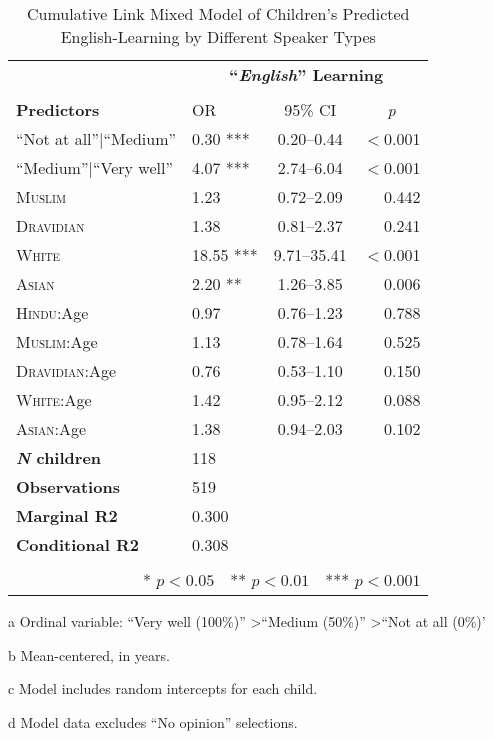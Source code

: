 \begin{table*}[t]
\small
\caption{Cumulative Link Mixed Model of Children's Predicted English-Learning by Different Speaker Types}\label{tab:english-ord}
    \centering
    \vspace{5pt}
\begin{threeparttable}
\begin{tabular}{llcr}
 \toprule
& \multicolumn{3}{c}{\textbf{``\textit{English}'' Learning}\tnote{a}} \\
\cline{2-4} \\[-.75em]
\textbf{Predictors} & {OR} & {95\% CI} & \multicolumn{1}{c}{\textit{p}} \\ 
\midrule
``Not at all''$|$``Medium'' & 0.30 *** & 0.20--0.44 & $<$0.001 \\ 
``Medium''$|$``Very well'' & 4.07 *** & 2.74--6.04 & $<$0.001 \\ 
  \textsc{Muslim} & 1.23 & 0.72--2.09 & 0.442 \\ 
  \textsc{Dravidian} & 1.38 & 0.81--2.37 & 0.241 \\ 
  \textsc{White} & 18.55 *** & 9.71--35.41 & $<$0.001 \\ 
  \textsc{Asian} & 2.20 ** & 1.26--3.85 & 0.006 \\ 
\textsc{Hindu}:Age\tnote{b} & 0.97 & 0.76--1.23 & 0.788 \\ 
  \textsc{Muslim}:Age & 1.13 & 0.78--1.64 & 0.525 \\ 
  \textsc{Dravidian}:Age & 0.76 & 0.53--1.10 & 0.150 \\ 
  \textsc{White}:Age & 1.42 & 0.95--2.12 & 0.088 \\ 
  \textsc{Asian}:Age & 1.38 & 0.94--2.03 & 0.102 \\ 
\midrule
\bfseries{\textit{N} children}\tnote{c} & 118 &  &  \\ 
\textbf{Observations}\tnote{d} & 519 &  &  \\ 
 \textbf{Marginal R2} & 0.300 &  &  \\ 
 \textbf{Conditional R2} & 0.308 &&\\
\bottomrule\\[-.75em]
\multicolumn{4}{r}{* $p<0.05$~~** $p<0.01$~~*** $p<0.001$}\\
\end{tabular}
\begin{tablenotes}[flushleft]
    \item[a] Ordinal variable: ``Very well (100\%)'' \textgreater ``Medium (50\%)'' \textgreater ``Not at all (0\%)'
    \item[b] Mean-centered, in years.
    \item[c] Model includes random intercepts for each child.
    \item[d] Model data excludes ``No opinion'' selections. 
\end{tablenotes}
\end{threeparttable}
\end{table*}
\clearpage
